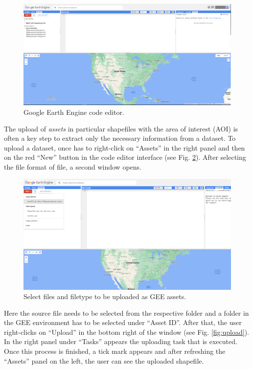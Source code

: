 \documentclass[
  10pt,
  b5paper,
  oneside]{book}
\begin{document}
\begin{figure}
\includegraphics[width=26.69in]{images/2.1_GEE_codeeditor} \caption{Google Earth Engine code editor.}\label{fig:GEE}
\end{figure}

The upload of \emph{assets} in particular shapefiles with the area of interest (AOI) is often a key step to extract only the necessary information from a dataset. To upload a dataset, once has to right-click on ``Assets'' in the right panel and then on the red ``New'' button in the code editor interface (see Fig. \ref{fig:asset}). After selecting the file format of file, a second window opens.

\begin{figure}
\includegraphics[width=23.42in]{images/2.2_upload-assets-1} \caption{Select files and filetype to be uploaded as GEE assets.}\label{fig:asset}
\end{figure}

Here the source file needs to be selected from the respective folder and a folder in the GEE environment has to be selected under ``Asset ID''. After that, the user right-clicks on ``Upload'' in the bottom right of the window (see Fig. \ref{fig:upload}). In the right panel under ``Tasks'' appears the uploading task that is executed. Once this process is finished, a tick mark appears and after refreshing the ``Assets'' panel on the left, the user can see the uploaded shapefile.
\end{document}
